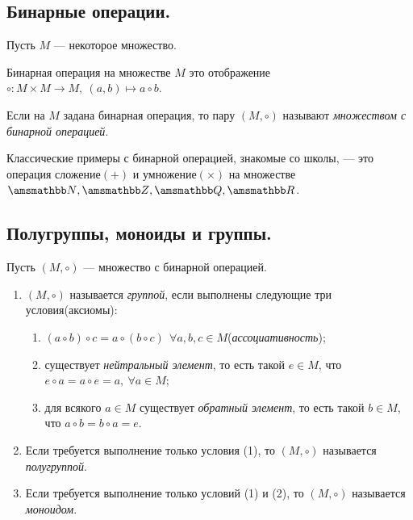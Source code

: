 \mysection
\subsection{Бинарные операции.}
Пусть $M$ --- некоторое множество.
\begin{definition}
  Бинарная операция на множестве $M$ это отображение
  $\circ: M \times M \to M,\ (a, b) \mapsto a \circ b$. 
\end{definition}
Если на $M$ задана бинарная операция, то пару $(M, \circ)$ называют
\textit{множеством с бинарной операцией}.

Классические примеры с бинарной операцией, знакомые со школы, ---
это операция сложение$(+)$ и умножение$(\times)$ на множестве 
$\NN, \ZZ, \QQ, \RR$.




\subsection{Полугруппы, моноиды и группы.}
Пусть $(M, \circ)$ --- множество с бинарной операцией.

\begin{definition}
  \vspace{-0.2cm}
  \begin{enumerate}[label=\Roman*.]
    \item $(M, \circ)$ называется \textit{группой}, 
    если выполнены следующие три условия(аксиомы):
    \begin{enumerate}[label=(\arabic*)]
      \item $(a \circ b) \circ c = a \circ (b \circ c)
      \ \ \forall a, b, c \in  M$(\textit{ассоциативность});
      \item существует \textit{нейтральный элемент}, то есть
      такой $e \in M$, что $e \circ a = a \circ e = a, \ \forall a \in M$;
      \item для всякого $a \in M$ существует \textit{обратный элемент},
      то есть такой $b \in M$, что $a \circ b = b \circ a = e$.
    \end{enumerate}
    \item Если требуется выполнение только условия (1),
    то $(M, \circ)$ называется \textit{полугруппой}.
    \item Если требуется выполнение только условий (1) и (2),
    то $(M, \circ)$ называется \textit{моноидом}.
  \end{enumerate}
\end{definition}

